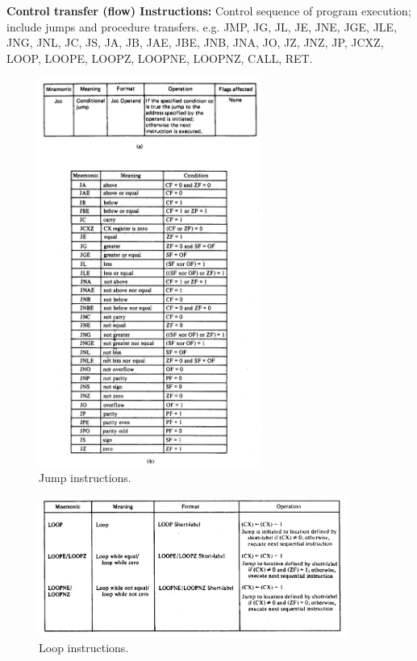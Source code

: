 \documentclass[12pt, a4paper]{scrartcl}
\begin{document}
	\textbf{Control transfer (flow) Instructions: }Control sequence of program execution; include jumps and procedure transfers. e.g. JMP, JG, JL, JE, JNE, JGE, JLE, JNG, JNL, JC, JS, JA, JB, JAE, JBE, JNB, JNA, JO, JZ, JNZ, JP, JCXZ, LOOP, LOOPE, LOOPZ, LOOPNE, LOOPNZ, CALL, RET.\\ 
	\begin{figure}[h]
		\centering
		\includegraphics[width=0.65\textwidth]{images/jump.png}
		\caption{Jump instructions.}
		\label{image-11}
	\end{figure}
	\begin{figure}[h]
		\centering
		\includegraphics[width=0.9\textwidth]{images/loop.png}
		\caption{Loop instructions.}
		\label{image-12}
	\end{figure}
	
\end{document}
